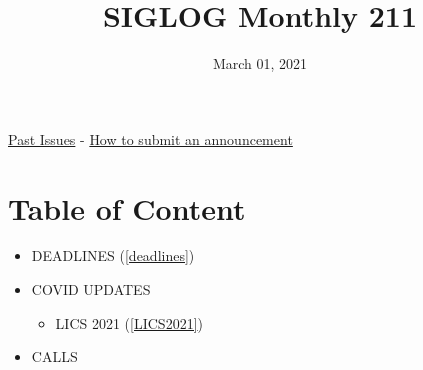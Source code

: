 \documentclass{article}
\begin{document}
\title{SIGLOG Monthly 211}\date{March 01, 2021}\maketitle


\href{https://lics.siglog.org/newsletters/}{Past Issues}
 - 
\href{https://lics.siglog.org/newsletters/inst.html}{How to submit an announcement}
\section{Table of Content}\begin{itemize}\item DEADLINES (\cref{deadlines}) 
 
\item COVID UPDATES 
 
\begin{itemize}\item LICS 2021 (\cref{LICS2021})
\end{itemize} 
\item CALLS 
 

\end{itemize}
\end{document}
